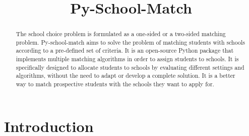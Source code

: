 \documentclass[twocolumn]{bmcart}
\begin{document}
	\begin{frontmatter}
		
		\begin{fmbox}
			
			
			\title{Py-School-Match}
			
			
			\author[
			addressref={aff1},
			email={aksran@mun.ca}
			]{ }
			
			
			
			\address[id=aff1]{%
				}
			
			\begin{abstractbox}
				
				\begin{abstract} %
					The school choice problem is formulated as a one-sided or a two-sided matching problem. Py-school-match aims to solve the problem of matching students with schools according to a pre-defined set of criteria. It is an open-source Python package that implements multiple matching algorithms in order to assign students to schools.  It is specifically designed to allocate students to schools by evaluating different settings and algorithms, without the need to adapt or develop a complete solution. It is a better way to match prospective students with the schools they want to apply for.
					
				\end{abstract}
				
				\begin{keyword}
				\end{keyword}
				
				
			\end{abstractbox}
		\end{fmbox}%
		
	\end{frontmatter}
	
	
	\section*{Introduction}
	\vspace{\baselineskip}
	
\end{document}
